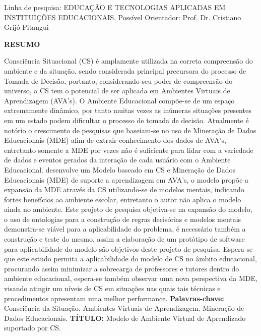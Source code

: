 \documentclass[
	oneside,
	12pt,				%
	a4paper,			%
	english,			%
	brazil,				%
	article
	]{abntex2}
\renewcommand{\imprimircapa}{%
	\begin{capa}%
		\center	
		{\ABNTEXchapterfont\imprimirinstituicao}
		\vfill
		\begin{center}
			\ABNTEXchapterfont\bfseries\imprimirtitulo
		\end{center}
		\vspace*{3cm}
		\begin{flushright}
		Linha de pesquisa: EDUCAÇÃO E TECNOLOGIAS APLICADAS EM INSTITUIÇÕES EDUCACIONAIS.
		\linebreak
		Possível Orientador: Prof. Dr. Cristiano Grijó Pitangui
		\end{flushright}
		\vfill
		\imprimirlocal 
		\linebreak		
		\imprimirdata
		\vspace*{1cm}
	\end{capa}
}
\begin{document}
 

\frenchspacing 

\imprimircapa

\textual

\OnehalfSpacing %
\begin{center}
	\ABNTEXchapterfont\bfseries RESUMO
\end{center}

Consciência Situacional (CS) é amplamente utilizada na correta compreensão do ambiente e da situação, sendo considerada principal precursora do processo de Tomada de Decisão, portanto, considerando seu poder de compreensão do universo, a CS tem o potencial de ser aplicada em Ambientes Virtuais de Aprendizagem (AVA’s).
O Ambiente Educacional compõe-se de um espaço extremamente dinâmico, por tanto muitas vezes as inúmeras situações presentes em um estado podem dificultar o processo de tomada de decisão. Atualmente é notório o crescimento de pesquisas que baseiam-se no uso de Mineração de Dados Educacionais (MDE) afim de extrair conhecimento dos dados de AVA's, entretanto somente a MDE por vezes não é suficiente para lidar com a variedade de dados e eventos gerados da interação de cada usuário com o Ambiente Educacional.  desenvolve um Modelo baseado em CS e Mineração de Dados Educacionais (MDE) de suporte a aprendizagem em AVA's, o modelo propõe a expansão da MDE através da CS utilizando-se de modelos mentais, indicando fortes benefícios ao ambiente escolar, entretanto o autor não aplica o modelo ainda no ambiente. Este projeto de pesquisa objetiva-se na expansão do modelo, o uso de ontologias para a construção de regras decisórias e modelos mentais demonstra-se viável para a aplicabilidade do problema, é necessário também a construção e teste do mesmo, assim a elaboração de um protótipo de software para aplicabilidade do modelo são objetivos deste projeto de pesquisa. Espera-se que este estudo permita a aplicabilidade do modelo de CS no âmbito educacional, procurando assim minimizar a sobrecarga de professores e tutores dentro do ambiente educacional, espera-se também observar uma nova perspectiva da MDE, visando atingir um níveis de CS em situações nas quais tais técnicas e procedimentos apresentam uma melhor performance. 
\linebreak\linebreak
\textbf{Palavras-chave:} Consciência da Situação. Ambientes Virtuais de Aprendizagem. Mineração de Dados Educacionais. 
\linebreak\linebreak
\textbf{TÍTULO:} Modelo de Ambiente Virtual de Aprendizado suportado por CS.
\end{document}
